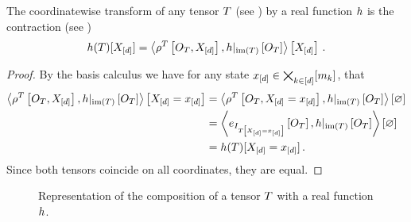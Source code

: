 \begin{theorem}
    \label{the:tensorFunctionComposition}
    The coordinatewise transform of any tensor $T$ (see ) by a real function $h$ is the contraction (see )
    \begin{align*}
        h(T)[X_{[d]}]
        = \left\langle \rho^{T}\left[O_{T},X_{[d]}\right],{h}|_{\mathrm{im}\left(T\right)}\left[O_{T}\right] \right\rangle \left[ X_{[d]} \right] \, .
    \end{align*}
\end{theorem}
\begin{proof}
    By the basis calculus  we have for any state $x_{[d]}\in\bigtimes_{k\in[d]}[m_{k}]$, that
    \begin{align*}
        \left\langle \rho^{T}\left[O_{T},X_{[d]}\right],{h}|_{\mathrm{im}\left(T\right)}\left[O_{T}\right]\right\rangle \left[ X_{[d]}=x_{[d]} \right]
        &= \left\langle \rho^{T}\left[O_{T},X_{[d]}=x_{[d]}\right],{h}|_{\mathrm{im}\left(T\right)}\left[O_{T}\right]\right\rangle \left[ \varnothing \right] \\
        & = \left\langle e_{I_{T\left[X_{[d]}=x_{[d]}\right]}}\left[O_{T}\right],{h}|_{\mathrm{im}\left(T\right)}\left[O_{T}\right]\right\rangle \left[ \varnothing \right] \\
        & = h(T)[X_{[d]}=x_{[d]}] \, .
    \end{align*}
    Since both tensors coincide on all coordinates, they are equal.
\end{proof}

\begin{figure}[h]
    \begin{center}
        
    \end{center}
    \caption{Representation of the composition of a tensor $T$ with a real function $h$.}
    \label{fig:tensorFunctionComposition}
\end{figure}


